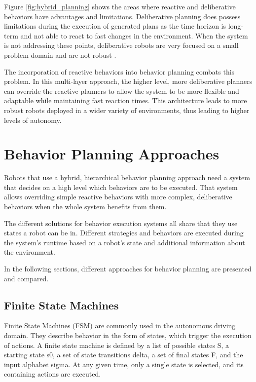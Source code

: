 Figure \ref{fig:hybrid_planning} shows the areas where reactive and deliberative behaviors have advantages and limitations. Deliberative planning does possess limitations during the execution of generated plans as the time horizon is long-term and not able to react to fast changes in the environment. When the system is not addressing these points, deliberative robots are very focused on a small problem domain and are not robust \cite{arkin1998}.

The incorporation of reactive behaviors into behavior planning combats this problem. In this multi-layer approach, the higher level, more deliberative planners can override the reactive planners to allow the system to be more flexible and adaptable while maintaining fast reaction times. 
This architecture leads to more robust robots deployed in a wider variety of environments, thus leading to higher levels of autonomy.

\section{Behavior Planning Approaches}
\label{sec:Behavior Planning Approaches}

Robots that use a hybrid, hierarchical behavior planning approach need a system that decides on a high level which behaviors are to be executed. That system allows overriding simple reactive behaviors with more complex, deliberative behaviors when the whole system benefits from them. 

The different solutions for behavior execution systems all share that they use states a robot can be in. Different strategies and behaviors are executed during the system's runtime based on a robot's state and additional information about the environment. 
 
In the following sections, different approaches for behavior planning are presented and compared.

\subsection{Finite State Machines}

Finite State Machines (FSM) are commonly used in the autonomous driving domain. They describe behavior in the form of states, which trigger the execution of actions. A finite state machine is defined by a list of possible states S, a starting state s0, a set of state transitions delta, a set of final states F, and the input alphabet sigma. At any given time, only a single state is selected, and its containing actions are executed. 

